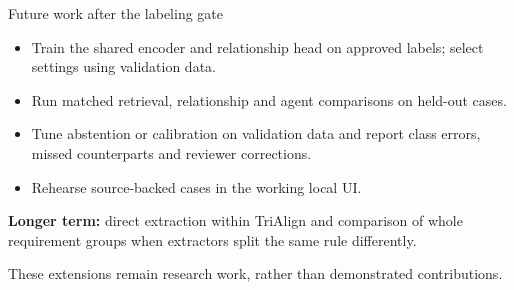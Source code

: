 \documentclass[aspectratio=169,11pt]{beamer}
\newcommand{\gap}{\par\vspace{.55em}}
\begin{document}
\begin{frame}{Future work after the labeling gate}
\begin{itemize}
\item Train the shared encoder and relationship head on approved labels;
select settings using validation data.
\item Run matched retrieval, relationship and agent comparisons on held-out cases.
\item Tune abstention or calibration on validation data and report class errors,
missed counterparts and reviewer corrections.
\item Rehearse source-backed cases in the working local UI.
\end{itemize}
\gap
\textbf{Longer term:} direct extraction within TriAlign and comparison of
whole requirement groups when extractors split the same rule differently.
\gap
{\small These extensions remain research work, rather than demonstrated contributions.}
\end{frame}
\end{document}
